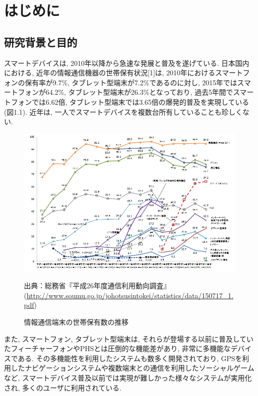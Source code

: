 \chapter{はじめに}
\label{chap:introduction}

\section{研究背景と目的}
スマートデバイスは, 2010年以降から急速な発展と普及を遂げている.
日本国内における, 近年の情報通信機器の世帯保有状況[1]は, 2010年におけるスマートフォンの保有率が9.7\%, タブレット型端末が7.2\%であるのに対し, 2015年ではスマートフォンが64.2\%, タブレット型端末が26.3\%となっており, 過去5年間でスマートフォンでは6.62倍, タブレット型端末では3.65倍の爆発的普及を実現している(図1.1).
近年は, 一人でスマートデバイスを複数台所有していることも珍しくない.

\begin{figure}[tb]
\begin{center}
\includegraphics[width=17cm]{fig/n4301010.png}
\caption{情報通信端末の世帯保有数の推移}
\end{center}
\begin{flushright}
出典：総務省『平成26年度通信利用動向調査』
(\url{http://www.soumu.go.jp/johotsusintokei/statistics/data/150717_1.pdf})
\end{flushright}
\end{figure}

また, スマートフォン, タブレット型端末は, それらが登場する以前に普及していたフィーチャーフォンやPHSとは圧倒的な機能差があり, 非常に多機能なデバイスである.
その多機能性を利用したシステムも数多く開発されており, GPSを利用したナビゲーションシステムや複数端末との通信を利用したソーシャルゲームなど, スマートデバイス普及以前では実現が難しかった様々なシステムが実用化され, 多くのユーザに利用されている.


